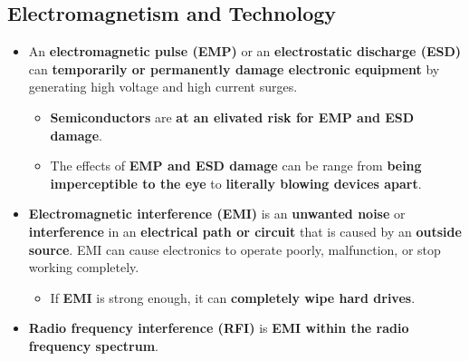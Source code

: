 \documentclass{article}
\begin{document}
    \subsection*{Electromagnetism and Technology}
    \begin{itemize}
        \item An \textbf{electromagnetic pulse (EMP)} or an \textbf{electrostatic discharge (ESD)} can \textbf{temporarily or permanently damage electronic equipment} by generating high voltage and high current surges.
        \begin{itemize}
            \item \textbf{Semiconductors} are \textbf{at an elivated risk for EMP and ESD damage}.
            \item The effects of \textbf{EMP and ESD damage} can be range from \textbf{being imperceptible to the eye} to \textbf{literally blowing devices apart}.
        \end{itemize}
        \item \textbf{Electromagnetic interference (EMI)} is an \textbf{unwanted noise} or \textbf{interference} in an \textbf{electrical path or circuit} that is caused by an \textbf{outside source}. EMI can cause electronics to operate poorly, malfunction, or stop working completely.
        \begin{itemize}
            \item If \textbf{EMI} is strong enough, it can \textbf{completely wipe hard drives}.
        \end{itemize}
        \item \textbf{Radio frequency interference (RFI)} is \textbf{EMI within the radio frequency spectrum}.
    \end{itemize}
    
\end{document}
